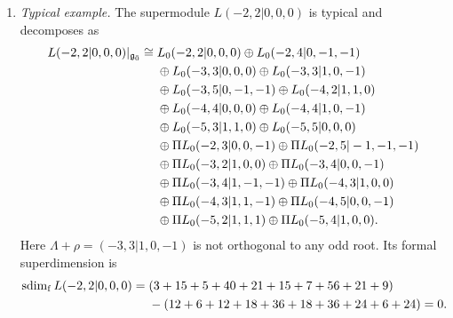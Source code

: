 \begin{example}
\begin{enumerate}
\item[(c)] \emph{Typical example.}
The supermodule $L(-2,2\vert0,0,0)$ is typical and decomposes as
\[
\begin{aligned}
L(-2,2\vert0,0,0)\vert_{{\mathfrak{g}_{\bar{0}}}}
\cong{}&L_0(-2,2\vert0,0,0)
\oplus L_0(-2,4\vert0,-1,-1)\\
&\oplus L_0(-3,3\vert0,0,0)
\oplus L_0(-3,3\vert1,0,-1)\\
&\oplus L_0(-3,5\vert0,-1,-1)
\oplus L_0(-4,2\vert1,1,0)\\
&\oplus L_0(-4,4\vert0,0,0)
\oplus L_0(-4,4\vert1,0,-1)\\
&\oplus L_0(-5,3\vert1,1,0)
\oplus L_0(-5,5\vert0,0,0)\\
&\oplus\Pi L_0(-2,3\vert0,0,-1)
\oplus\Pi L_0(-2,5\vert-1,-1,-1)\\
&\oplus\Pi L_0(-3,2\vert1,0,0)
\oplus\Pi L_0(-3,4\vert0,0,-1)\\
&\oplus\Pi L_0(-3,4\vert1,-1,-1)
\oplus\Pi L_0(-4,3\vert1,0,0)\\
&\oplus\Pi L_0(-4,3\vert1,1,-1)
\oplus\Pi L_0(-4,5\vert0,0,-1)\\
&\oplus\Pi L_0(-5,2\vert1,1,1)
\oplus\Pi L_0(-5,4\vert1,0,0).
\end{aligned}
\]
Here $\Lambda+\rho=(-3,3\vert1,0,-1)$ is not orthogonal to any
odd root. Its formal superdimension is
\[
\begin{aligned}
\operatorname{sdim}_{\mathrm f} L(-2,2\vert0,0,0)
={}&(3+15+5+40+21+15+7+56+21+9)\\
&-(12+6+12+18+36+18+36+24+6+24)=0.
\end{aligned}
\]
\end{enumerate}
\end{example}

